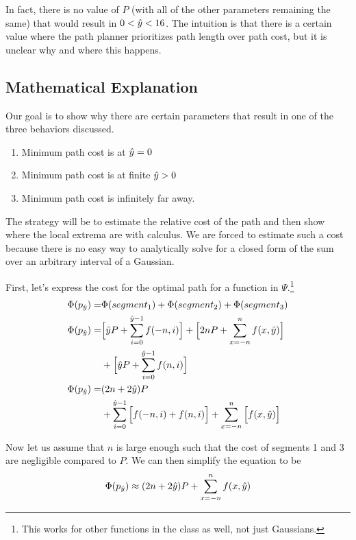 In fact, there is no value of $P$ (with all of the other parameters remaining the same) that would result in $0<\hat{y}<16$. The intuition is that there is a certain value where the path planner prioritizes path length over path cost, but it is unclear why and where this happens. 





\subsection{Mathematical Explanation}
Our goal is to show why there are certain parameters that result in one of the three behaviors discussed. 
\begin{enumerate}
\item Minimum path cost is at $\hat{y}=0$
\item Minimum path cost is at finite $\hat{y}>0$
\item Minimum path cost is infinitely far away. 
\end{enumerate}

The strategy will be to estimate the relative cost of the path and then show where the local extrema are with calculus. We are forced to estimate such a cost because there is no easy way to analytically solve for a closed form of the sum over an arbitrary interval of a Gaussian. 

First, let's express the cost for the optimal path for a function in $\Psi$.\footnote{This works for other functions in the class as well, not just Gaussians.}
\begin{align*}
\Phi(p_{\hat{y}}) =&\Phi(segment_1) + \Phi(segment_2) + \Phi(segment_3) \\
\Phi(p_{\hat{y}}) =&\Big[\hat{y} P + \sum\limits_{i=0}^{\hat{y}-1} f(-n, i) \Big] +
         \Big[2nP + \sum\limits_{x=-n}^{n}    f(x,\hat{y}) \Big]\\
     &+\Big[\hat{y} P + \sum\limits_{i=0}^{\hat{y}-1} f(n, i) \Big] \\
\Phi(p_{\hat{y}}) =&(2n+2\hat{y})P \\ &+\sum\limits_{i=0}^{\hat{y}-1} \Big[ f(-n, i) + f(n, i) \Big] + \sum\limits_{x=-n}^{n} \Big[f(x,\hat{y}) \Big]
\end{align*}

Now let us assume that $n$ is large enough such that the cost of segments 1 and 3 are negligible compared to $P$. We can then simplify the equation to be
\[
\Phi(p_{\hat{y}}) \approx (2n+2\hat{y})P +  \sum\limits_{x=-n}^{n} f(x,\hat{y})
\]


